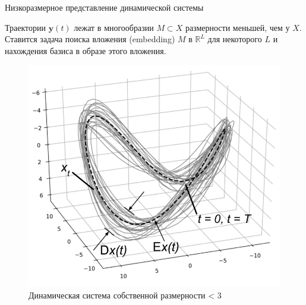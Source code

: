 \documentclass[10pt]{beamer}
\theoremstyle{definition}
\begin{document}
	\begin{frame}{Низкоразмерное представление динамической системы}
		
		Траектории $ \textbf{y}(t) $ лежат в многообразии $ M \subset X $ размерности  меньшей, чем у $ X $. Ставится задача поиска вложения (embedding) $ M $ в $ \mathbb{R}^{L} $ для некоторого $ L $ и нахождения базиса в образе этого вложения.
		
		\begin{figure}[h]
			\centering
			
			\includegraphics[width=0.6\textheight, keepaspectratio]{img/dynamic_system_example.png}
			\caption{Динамическая система собственной размерности < 3}
			
		\end{figure}
		
	\end{frame}
	
\end{document}
